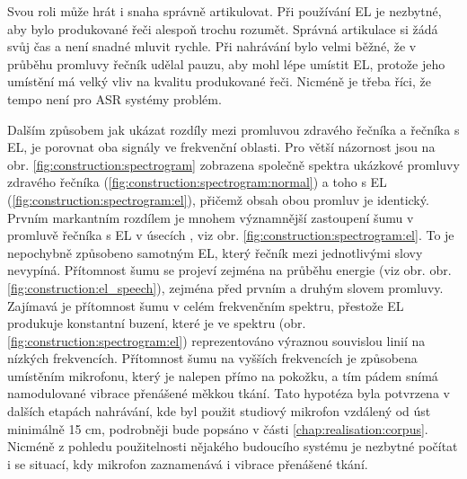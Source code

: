 
Svou roli může hrát i snaha správně artikulovat.
Při používání EL je nezbytné, aby bylo produkované řeči alespoň trochu rozumět.
Správná artikulace si žádá svůj čas a není snadné mluvit rychle.
Při nahrávání bylo velmi běžné, že v průběhu promluvy řečník udělal pauzu, aby mohl lépe umístit EL, protože jeho umístění má velký vliv na kvalitu produkované řeči.
Nicméně je třeba říci, že tempo není pro ASR systémy problém.

Dalším způsobem jak ukázat rozdíly mezi promluvou zdravého řečníka a řečníka s EL, je porovnat oba signály ve frekvenční oblasti.
Pro větší názornost jsou na obr. \ref{fig:construction:spectrogram} zobrazena společně spektra ukázkové promluvy zdravého řečníka (\ref{fig:construction:spectrogram:normal}) a toho s EL (\ref{fig:construction:spectrogram:el}), přičemž obsah obou promluv je identický.
Prvním markantním rozdílem je mnohem významnější zastoupení šumu v promluvě řečníka s EL v úsecích , viz obr. \ref{fig:construction:spectrogram:el}.
To je nepochybně způsobeno samotným EL, který řečník mezi jednotlivými slovy nevypíná.
Přítomnost šumu se projeví zejména na průběhu energie (viz obr. obr. \ref{fig:construction:el_speech}), zejména před prvním a druhým slovem promluvy.
Zajímavá je přítomnost šumu v celém frekvenčním spektru, přestože EL produkuje konstantní buzení, které je ve spektru (obr. \ref{fig:construction:spectrogram:el}) reprezentováno výraznou souvislou linií na nízkých frekvencích.
Přítomnost šumu na vyšších frekvencích je způsobena umístěním mikrofonu, který je nalepen přímo na pokožku, a tím pádem snímá namodulované vibrace přenášené měkkou tkání.
Tato hypotéza byla potvrzena v dalších etapách nahrávání, kde byl použit studiový mikrofon vzdálený od úst minimálně 15 cm, podrobněji bude popsáno v části \ref{chap:realisation:corpus}.
Nicméně z pohledu použitelnosti nějakého budoucího systému je nezbytné počítat i se situací, kdy mikrofon zaznamenává i vibrace přenášené tkání.

